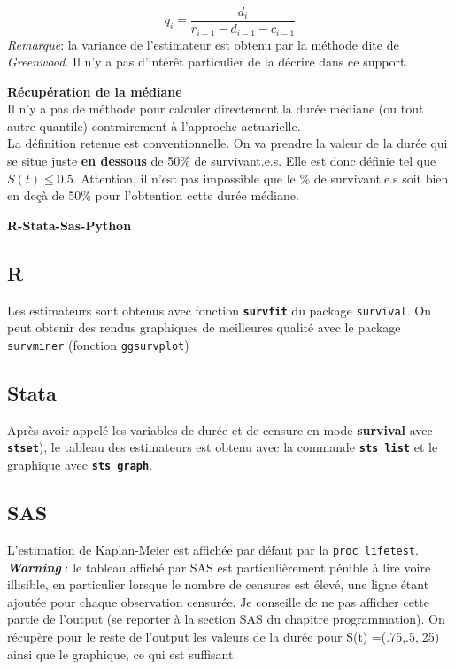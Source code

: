 \documentclass[
  12pt,
  letterpaper,
  DIV=11,
  numbers=noendperiod,
  onepage,
  openany]{scrreprt}
\begin{document}
\[q_i=\frac{d_i}{r_{i-1}-d_{i-1}-c_{i-1}}\] \emph{Remarque}: la variance
de l'estimateur est obtenu par la méthode dite de \emph{Greenwood}. Il
n'y a pas d'intérêt particulier de la décrire dans ce support.

\textbf{Récupération de la médiane}\\
Il n'y a pas de méthode pour calculer directement la durée médiane (ou
tout autre quantile) contrairement à l'approche actuarielle.\\
La définition retenue est conventionnelle. On va prendre la valeur de la
durée qui se situe juste \textbf{en dessous} de 50\% de survivant.e.s.
Elle est donc définie tel que \(S(t)\leq0.5\). Attention, il n'est pas
impossible que le \% de survivant.e.s soit bien en deçà de 50\% pour
l'obtention cette durée médiane.

\textbf{R-Stata-Sas-Python}

\subsection{R}

Les estimateurs sont obtenus avec fonction \textbf{\texttt{survfit}} du
package \texttt{survival}. On peut obtenir des rendus graphiques de
meilleures qualité avec le package \texttt{survminer} (fonction
\texttt{ggsurvplot})

\subsection{Stata}

Après avoir appelé les variables de durée et de censure en mode
\textbf{survival} avec \textbf{\texttt{stset}}), le tableau des
estimateurs est obtenu avec la commande \textbf{\texttt{sts\ list}} et
le graphique avec \textbf{\texttt{sts\ graph}}.

\subsection{SAS}

L'estimation de Kaplan-Meier est affichée par défaut par la
\texttt{proc\ lifetest}. \textbf{\emph{Warning}} : le tableau affiché
par SAS est particulièrement pénible à lire voire illisible, en
particulier lorsque le nombre de censures est élevé, une ligne étant
ajoutée pour chaque observation censurée. Je conseille de ne pas
afficher cette partie de l'output (se reporter à la section SAS du
chapitre programmation). On récupère pour le reste de l'output les
valeurs de la durée pour S(t) =(.75,.5,.25) ainsi que le graphique, ce
qui est suffisant.
\end{document}
